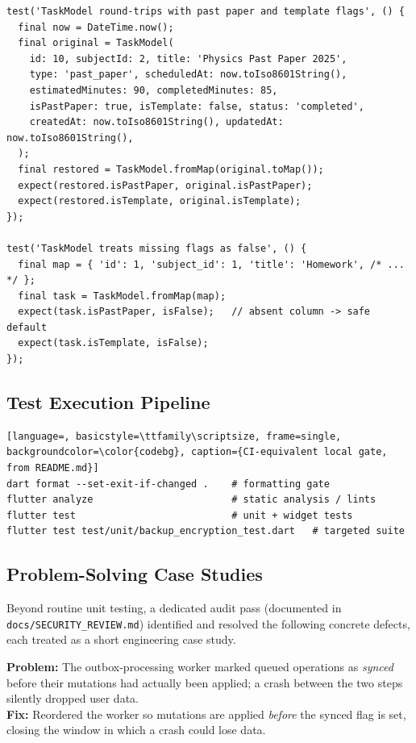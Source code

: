 \documentclass[11pt,a4paper]{article}
\begin{document}
\begin{lstlisting}[caption={\texttt{test/unit/adaptive\_estimates\_test.dart} --- round-trip and missing-field defaults}]
test('TaskModel round-trips with past paper and template flags', () {
  final now = DateTime.now();
  final original = TaskModel(
    id: 10, subjectId: 2, title: 'Physics Past Paper 2025',
    type: 'past_paper', scheduledAt: now.toIso8601String(),
    estimatedMinutes: 90, completedMinutes: 85,
    isPastPaper: true, isTemplate: false, status: 'completed',
    createdAt: now.toIso8601String(), updatedAt: now.toIso8601String(),
  );
  final restored = TaskModel.fromMap(original.toMap());
  expect(restored.isPastPaper, original.isPastPaper);
  expect(restored.isTemplate, original.isTemplate);
});

test('TaskModel treats missing flags as false', () {
  final map = { 'id': 1, 'subject_id': 1, 'title': 'Homework', /* ... */ };
  final task = TaskModel.fromMap(map);
  expect(task.isPastPaper, isFalse);   // absent column -> safe default
  expect(task.isTemplate, isFalse);
});
\end{lstlisting}

\subsection{Test Execution Pipeline}
\begin{lstlisting}[language=, basicstyle=\ttfamily\scriptsize, frame=single, backgroundcolor=\color{codebg}, caption={CI-equivalent local gate, from README.md}]
dart format --set-exit-if-changed .    # formatting gate
flutter analyze                        # static analysis / lints
flutter test                           # unit + widget tests
flutter test test/unit/backup_encryption_test.dart   # targeted suite
\end{lstlisting}

\subsection{Problem-Solving Case Studies}
Beyond routine unit testing, a dedicated audit pass (documented in \texttt{docs/SECURITY\_REVIEW.md}) identified and resolved the following concrete defects, each treated as a short engineering case study.

\begin{tcolorbox}[colback=softgray, colframe=primaryblue, title={Case 1 --- Sync worker data loss}, fonttitle=\bfseries, coltitle=white, colbacktitle=primaryblue, arc=2pt]
\textbf{Problem:} The outbox-processing worker marked queued operations as \emph{synced} before their mutations had actually been applied; a crash between the two steps silently dropped user data. \\
\textbf{Fix:} Reordered the worker so mutations are applied \emph{before} the synced flag is set, closing the window in which a crash could lose data.
\end{tcolorbox}
\end{document}
